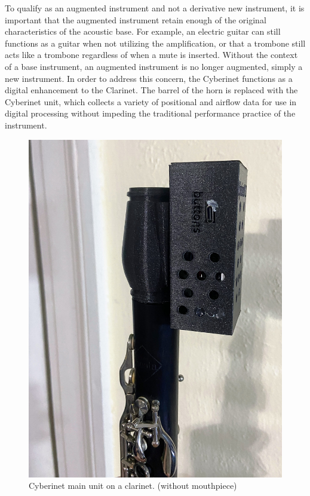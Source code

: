 To qualify as an augmented instrument and not a derivative new instrument, it is important that the augmented instrument retain enough of the original characteristics of the acoustic base\cite{miranda_Wanderley_instrumentControl_2006}. For example, an electric guitar can still functions as a guitar when not utilizing the amplification, or that a trombone still acts like a trombone regardless of when a mute is inserted. Without the context of a base instrument, an augmented instrument is no longer augmented, simply a new instrument. In order to address this concern, the Cyberinet functions as a digital enhancement to the Clarinet. The barrel of the horn is replaced with the Cyberinet unit, which collects a variety of positional and airflow data for use in digital processing without impeding the traditional performance practice of the instrument.

\begin{figure}
    \centering
    \includegraphics[scale=0.1]{diagrams/IMG_2212.JPG}
    \caption{Cyberinet main unit on a clarinet. (without mouthpiece)}
    \label{fig:MainUnit}
\end{figure}


